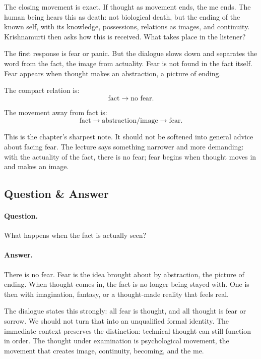 The closing movement is exact. If thought as movement ends, the me ends. The human being hears this as death: not biological death, but the ending of the known self, with its knowledge, possessions, relations as images, and continuity. Krishnamurti then asks how this is received. What takes place in the listener?

The first response is fear or panic. But the dialogue slows down and separates the word from the fact, the image from actuality. Fear is not found in the fact itself. Fear appears when thought makes an abstraction, a picture of ending.

The compact relation is:
\begin{equation}
\text{fact} \longrightarrow \text{no fear}.
\end{equation}

The movement away from fact is:
\begin{equation}
\text{fact}
\longrightarrow
\text{abstraction/image}
\longrightarrow
\text{fear}.
\end{equation}

This is the chapter's sharpest note. It should not be softened into general advice about facing fear. The lecture says something narrower and more demanding: with the actuality of the fact, there is no fear; fear begins when thought moves in and makes an image.

\subsection{Question \& Answer}

\paragraph{Question.}
What happens when the fact is actually seen?

\paragraph{Answer.}
There is no fear. Fear is the idea brought about by abstraction, the picture of ending. When thought comes in, the fact is no longer being stayed with. One is then with imagination, fantasy, or a thought-made reality that feels real.

The dialogue states this strongly: all fear is thought, and all thought is fear or sorrow. We should not turn that into an unqualified formal identity. The immediate context preserves the distinction: technical thought can still function in order. The thought under examination is psychological movement, the movement that creates image, continuity, becoming, and the me.

